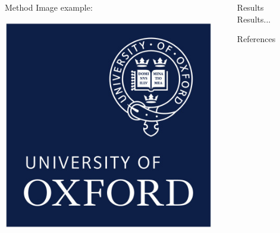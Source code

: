 \documentclass[final,hyperref={pdfpagelabels=false}]{beamer}
\newcommand{\shrink}{-15pt}
\begin{document}
\begin{frame}[t]
\begin{columns}[t]
\begin{column}{.47\textwidth}
\begin{block}{Method}
      Image example:
      \begin{center}
        \includegraphics[width=0.75\columnwidth]{oxford_logo.jpg}
      \end{center}
    \end{block}
  \end{column} %


  \begin{column}{.01\textwidth}\end{column} %

  \begin{column}{.47\textwidth} %
    \vspace{\shrink} 
    \begin{block}{Results}
      Results...
    \end{block}

    \begin{block}{References}
      \nocite{*} %
      \linespread{0.928}\selectfont
      \footnotesize{
      }
    \end{block}

  \end{column} %

  \begin{column}{.01\textwidth}\end{column} %

\end{columns} %

\end{frame} %
\end{document}
